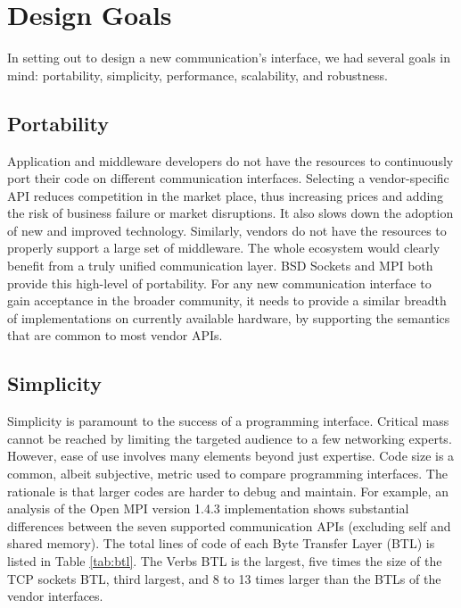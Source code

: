 \section{Design Goals}
\label{sec:design}

In setting out to design a new communication's interface, we had several goals 
in mind: portability, simplicity, performance, scalability, and robustness.

\subsection{Portability}
Application and middleware developers do not have the resources to continuously 
port their code on different communication interfaces. 
Selecting a vendor-specific API reduces competition in the market place, thus 
increasing prices and adding the risk of business failure or market disruptions. It 
also slows down the adoption of new and improved technology. 
Similarly, vendors do not have the resources to properly support a large set 
of middleware. The whole ecosystem would clearly benefit from a truly unified 
communication layer. 
BSD Sockets and MPI both provide this high-level of portability. 
For any new communication interface to gain acceptance in the broader 
community, it needs to provide a similar breadth of implementations on 
currently available hardware, by supporting the semantics that are common 
to most vendor APIs.

\subsection{Simplicity}
Simplicity is paramount to the success of a programming interface. Critical 
mass cannot be reached by limiting the targeted audience to a few networking 
experts. However, ease of use involves many elements beyond just expertise. 
Code size is a common, albeit subjective, metric used to compare programming 
interfaces. The rationale is that larger codes are harder to debug and 
maintain. For example, an analysis of the Open MPI version 1.4.3 implementation shows substantial
differences between the seven supported communication APIs (excluding self and 
shared memory). The total lines of code of each Byte Transfer Layer (BTL) is 
listed in Table \ref{tab:btl}. The Verbs BTL is the largest, five times the size 
of the TCP sockets BTL, third largest, and 8 to 13 times larger than the BTLs of 
the vendor interfaces. 

